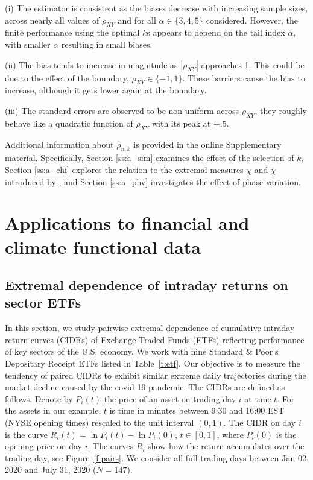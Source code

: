 \documentclass[lineno]{biometrika}
\newcommand \ag{\alpha}
\begin{document}
\noindent (i) The estimator is consistent as the biases decrease with increasing sample sizes, across nearly all values of $\rho_{XY}$ and for all $\ag \in \{3,4,5\}$ considered. However, the finite performance using the optimal $k$s appears to depend on the tail index $\ag$, with smaller $\ag$ resulting in small biases.



\noindent (ii) The bias tends to increase in magnitude as $|\rho_{XY}|$ approaches 1. This could be due to the effect of the boundary, $\rho_{XY} \in \{-1, 1\}$. These barriers cause the bias to increase, although it gets lower again at the boundary.



\noindent (iii) The standard errors are observed  to be non-uniform across $\rho_{XY}$, they roughly behave like a quadratic function of $\rho_{XY}$ with its peak at $\pm.5$.


Additional information about
$\hat\rho_{n,k}$ is provided in the online Supplementary material.
Specifically, Section
\ref{ss:a_sim} examines the effect of the
selection of $k$, Section \ref{ss:a_chi} explores the relation to the extremal measures $\chi$ and $\bar{\chi}$ introduced by \citet{coles:heffernan:tawn:1999}, and Section \ref{ss:a_phv} investigates the effect of phase variation.




\section{Applications to financial and climate functional data} \label{s:dt}



\subsection{Extremal dependence of  intraday returns
on sector ETFs} \label{ss:etf}



In this section, we study pairwise extremal dependence of cumulative intraday return curves (CIDRs) of  Exchange Traded Funds (ETFs) reflecting
performance of key sectors of the U.S. economy. We work with  nine
Standard \& Poor's  Depositary Receipt ETFs listed in Table~\ref{t:etf}.
Our objective is to
measure the tendency of paired CIDRs to exhibit similar extreme daily trajectories during the market decline caused by the covid-19 pandemic.
The CIDRs are defined as follows. Denote by $P_i(t)$ the price of an asset
on trading day $i$ at time $t$. For the assets in our example, $t$ is time in minutes between 9:30 and 16:00 EST (NYSE opening times) rescaled to the unit interval $(0,1)$. The CIDR on day $i$ is  the curve $R_i(t) = \ln P_i(t) - \ln P_i(0)$, $t\in [0,1]$, where $P_i(0)$ is the opening price on day $i$. The curves $R_i$ show how the return accumulates over the trading day, see  Figure~\ref{f:pairs}. We consider all full trading days between  Jan 02, 2020 and  July 31, 2020 ($N=147$).
\end{document}
